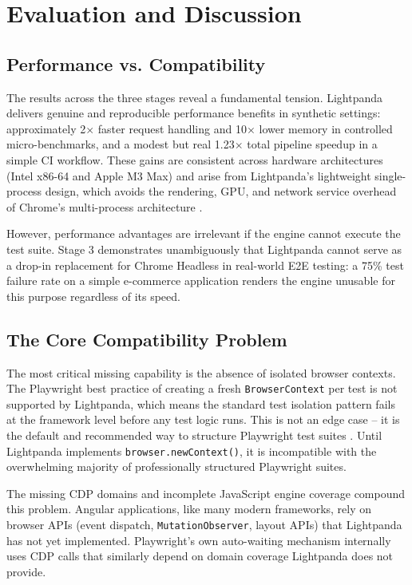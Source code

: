 \section{Evaluation and Discussion}
\label{sec:evaluation}

\subsection{Performance vs. Compatibility}

The results across the three stages reveal a fundamental tension. Lightpanda delivers genuine and reproducible performance benefits in synthetic settings: approximately 2$\times$ faster request handling and 10$\times$ lower memory in controlled micro-benchmarks, and a modest but real 1.23$\times$ total pipeline speedup in a simple CI workflow. These gains are consistent across hardware architectures (Intel x86-64 and Apple M3 Max) and arise from Lightpanda's lightweight single-process design, which avoids the rendering, GPU, and network service overhead of Chrome's multi-process architecture \cite{reis2009isolating}.

However, performance advantages are irrelevant if the engine cannot execute the test suite. Stage 3 demonstrates unambiguously that Lightpanda cannot serve as a drop-in replacement for Chrome Headless in real-world E2E testing: a 75\% test failure rate on a simple e-commerce application renders the engine unusable for this purpose regardless of its speed.

\subsection{The Core Compatibility Problem}

The most critical missing capability is the absence of isolated browser contexts. The Playwright best practice of creating a fresh \texttt{BrowserContext} per test is not supported by Lightpanda, which means the standard test isolation pattern fails at the framework level before any test logic runs. This is not an edge case -- it is the default and recommended way to structure Playwright test suites \cite{playwright2024}. Until Lightpanda implements \texttt{browser.newContext()}, it is incompatible with the overwhelming majority of professionally structured Playwright suites.

The missing CDP domains and incomplete JavaScript engine coverage compound this problem. Angular applications, like many modern frameworks, rely on browser APIs (event dispatch, \texttt{MutationObserver}, layout APIs) that Lightpanda has not yet implemented. Playwright's own auto-waiting mechanism internally uses CDP calls that similarly depend on domain coverage Lightpanda does not provide.

